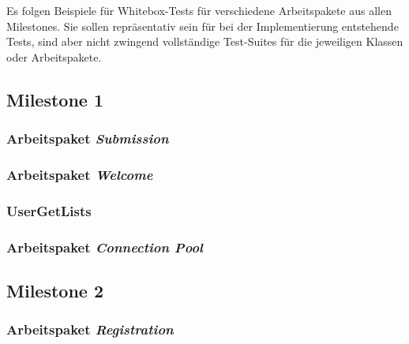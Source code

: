 \lstset{
    language=Java,
    basicstyle=\ttfamily\selectfont\scriptsize,
}

\newcommand{\testlisting}[1]{}

Es folgen Beispiele für Whitebox-Tests für verschiedene Arbeitspakete aus allen Milestones.
Sie sollen repräsentativ sein für bei der Implementierung entstehende Tests, sind aber nicht zwingend vollständige
Test-Suites für die jeweiligen Klassen oder Arbeitspakete.

\subsection{Milestone 1}\label{subsec:milestone1}

\subsubsection{Arbeitspaket \emph{Submission}}
\testlisting{SubmissionBackingTest}
\testlisting{SubmissionServiceTest}
\testlisting{SubmissionRepositoryTest}

\subsubsection{Arbeitspaket \emph{Welcome}}
\testlisting{LoginServiceTest}

\subsubsection{UserGetLists}
\testlisting{UserRepositoryGetListTest}

\subsubsection{Arbeitspaket \emph{Connection Pool}}
\testlisting{TransactionTest}
\testlisting{ConnectionPoolTest}

\subsection{Milestone 2}\label{subsec:milestone2}

\subsubsection{Arbeitspaket \emph{Registration}}
\testlisting{PasswordValidatorTest}
\testlisting{RegistrationServiceTest}
\testlisting{UserRepositoryTest}

